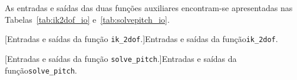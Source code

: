 As entradas e saídas das duas funções auxiliares encontram-se apresentadas nas Tabelas~\ref{tab:ik2dof_io} e~\ref{tab:solvepitch_io}.

\noindent\hspace*{-1.2cm}%
\begin{minipage}{\dimexpr\textwidth+2.4cm\relax}
    \small
    \captionsetup{justification=centering}
    \begin{minipage}[b]{\dimexpr(\linewidth-1cm)/2\relax}
        [Entradas e saídas da função \texttt{ik\_2dof}.]{Entradas e saídas da função\newline\texttt{ik\_2dof}.}
        \label{tab:ik2dof_io}
    \end{minipage}\hspace{1cm}%
    \begin{minipage}[b]{\dimexpr(\linewidth-1cm)/2\relax}
        [Entradas e saídas da função \texttt{solve\_pitch}.]{Entradas e saídas da função\newline\texttt{solve\_pitch}.}
        \label{tab:solvepitch_io}
    \end{minipage}


\end{minipage}
